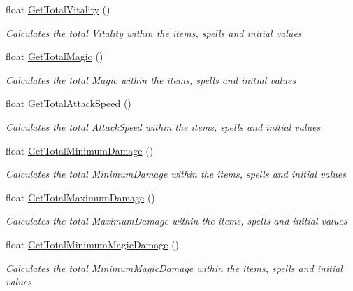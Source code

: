 \begin{DoxyCompactItemize}
float \hyperlink{class_hel_project_1_1_features_1_1_feature_manager_adcdbe81d240dd214000ca6a1bc46f9b1}{Get\+Total\+Vitality} ()
\begin{DoxyCompactList}\small\item\em Calculates the total Vitality within the items, spells and initial values \end{DoxyCompactList}\item 
float \hyperlink{class_hel_project_1_1_features_1_1_feature_manager_a8795128921c9d40161ea2cc54f0cd558}{Get\+Total\+Magic} ()
\begin{DoxyCompactList}\small\item\em Calculates the total Magic within the items, spells and initial values \end{DoxyCompactList}\item 
float \hyperlink{class_hel_project_1_1_features_1_1_feature_manager_a180a0742fc037b731348d82b960bd007}{Get\+Total\+Attack\+Speed} ()
\begin{DoxyCompactList}\small\item\em Calculates the total Attack\+Speed within the items, spells and initial values \end{DoxyCompactList}\item 
float \hyperlink{class_hel_project_1_1_features_1_1_feature_manager_a70cd5fd60ddb0d35810f4e8f55fdeadc}{Get\+Total\+Minimum\+Damage} ()
\begin{DoxyCompactList}\small\item\em Calculates the total Minimum\+Damage within the items, spells and initial values \end{DoxyCompactList}\item 
float \hyperlink{class_hel_project_1_1_features_1_1_feature_manager_aa2a965173213b11c08f3b25f5c920ccb}{Get\+Total\+Maximum\+Damage} ()
\begin{DoxyCompactList}\small\item\em Calculates the total Maximum\+Damage within the items, spells and initial values \end{DoxyCompactList}\item 
float \hyperlink{class_hel_project_1_1_features_1_1_feature_manager_aca527aecc8a8ea7370bc279e3237279b}{Get\+Total\+Minimum\+Magic\+Damage} ()
\begin{DoxyCompactList}\small\item\em Calculates the total Minimum\+Magic\+Damage within the items, spells and initial values \end{DoxyCompactList}\item 

\end{DoxyCompactItemize}
